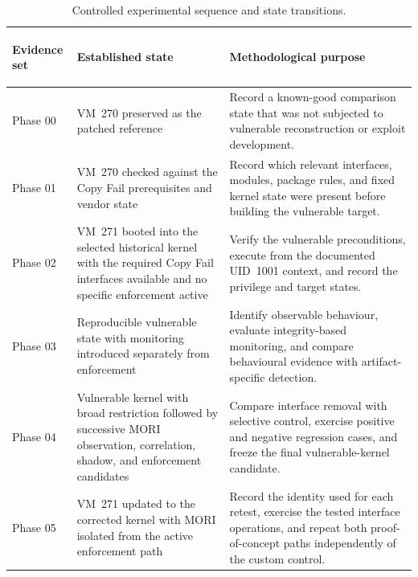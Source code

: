 \begin{table}[H]
    \centering
    \caption{Controlled experimental sequence and state transitions.}
    \label{tab:experimental-sequence}
    \small
    \begin{tabularx}{\textwidth}{@{}>{\bfseries\raggedright\arraybackslash}p{}>{\raggedright\arraybackslash}p{}Y@{}}
        \toprule
        Evidence set & Established state & Methodological purpose \\
        \midrule
        Phase 00 &
        VM~270 preserved as the patched reference &
        Record a known-good comparison state that was not subjected to
        vulnerable reconstruction or exploit development. \\

        Phase 01 &
        VM~270 checked against the Copy Fail prerequisites and vendor state &
        Record which relevant interfaces, modules, package rules, and fixed
        kernel state were present before building the vulnerable target. \\

        Phase 02 &
        VM~271 booted into the selected historical kernel with the required
        Copy Fail interfaces available and no specific enforcement active &
        Verify the vulnerable preconditions, execute from the documented
        UID~1001 context, and record the privilege and target states. \\

        Phase 03 &
        Reproducible vulnerable state with monitoring introduced separately
        from enforcement &
        Identify observable behaviour, evaluate integrity-based monitoring,
        and compare behavioural evidence with artifact-specific detection. \\

        Phase 04 &
        Vulnerable kernel with broad restriction followed by successive MORI
        observation, correlation, shadow, and enforcement candidates &
        Compare interface removal with selective control, exercise positive and
        negative regression cases, and freeze the final vulnerable-kernel
        candidate. \\

        Phase 05 &
        VM~271 updated to the corrected kernel with MORI isolated from the
        active enforcement path &
        Record the identity used for each retest, exercise the tested interface
        operations, and repeat both proof-of-concept paths independently of the
        custom control. \\
        \bottomrule
    \end{tabularx}
\end{table}

